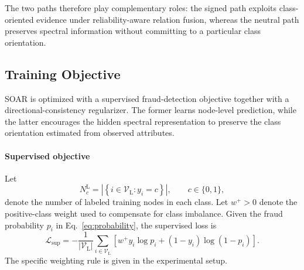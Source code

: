 \documentclass[10pt,journal]{IEEEtran}
\begin{document}
The two paths therefore play complementary roles: the signed path exploits
class-oriented evidence under reliability-aware relation fusion, whereas the
neutral path preserves spectral information without committing to a
particular class orientation.


\subsection{Training Objective}
\label{sec:objective}

SOAR is optimized with a supervised fraud-detection objective together with
a directional-consistency regularizer. The former learns node-level
prediction, while the latter encourages the hidden spectral representation
to preserve the class orientation estimated from observed attributes.

\paragraph{Supervised objective}
Let
\begin{equation}
N_c^{\mathrm L}
=
\left|
\left\{
i\in\mathcal{V}_{\mathrm L}:y_i=c
\right\}
\right|,
\qquad
c\in\{0,1\},
\label{eq:global_class_count}
\end{equation}
denote the number of labeled training nodes in each class.
Let $w^{+}>0$ denote the positive-class weight used to compensate for
class imbalance. Given the fraud probability $p_i$ in
Eq.~\eqref{eq:probability}, the supervised loss is
\begin{equation}
\mathcal{L}_{\mathrm{sup}}
=
-\frac{1}{|\mathcal{V}_{\mathrm L}|}
\sum_{i\in\mathcal{V}_{\mathrm L}}
\left[
w^{+}y_i\log p_i
+
(1-y_i)\log(1-p_i)
\right].
\label{eq:supervised_loss}
\end{equation}
The specific weighting rule is given in the experimental setup.
\end{document}
